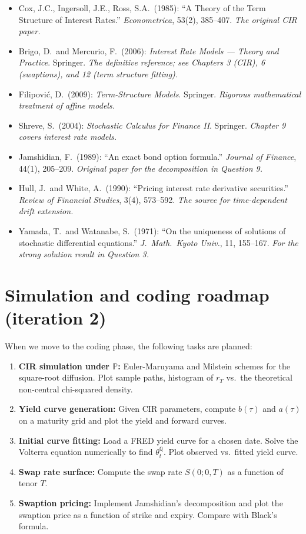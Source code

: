 \documentclass[11pt]{article}
\newcommand{\PP}{\mathbb{P}}
\newcommand{\QQ}{\mathbb{Q}}
\begin{document}
\begin{itemize}
  \item Cox, J.C., Ingersoll, J.E., Ross, S.A.\ (1985): ``A Theory of
  the Term Structure of Interest Rates.''  \emph{Econometrica}, 53(2),
  385--407.  \textit{The original CIR paper.}
  \item Brigo, D.\ and Mercurio, F.\ (2006): \emph{Interest Rate Models ---
  Theory and Practice}.  Springer.  \textit{The definitive reference;
  see Chapters 3 (CIR), 6 (swaptions), and 12 (term structure fitting).}
  \item Filipovi\'{c}, D.\ (2009): \emph{Term-Structure Models}.
  Springer.  \textit{Rigorous mathematical treatment of affine models.}
  \item Shreve, S.\ (2004): \emph{Stochastic Calculus for Finance II}.
  Springer.  \textit{Chapter 9 covers interest rate models.}
  \item Jamshidian, F.\ (1989): ``An exact bond option formula.''
  \emph{Journal of Finance}, 44(1), 205--209.  \textit{Original paper for
  the decomposition in Question 9.}
  \item Hull, J.\ and White, A.\ (1990): ``Pricing interest rate derivative
  securities.''  \emph{Review of Financial Studies}, 3(4), 573--592.
  \textit{The source for time-dependent drift extension.}
  \item Yamada, T.\ and Watanabe, S.\ (1971): ``On the uniqueness of
  solutions of stochastic differential equations.''
  \emph{J.\ Math.\ Kyoto Univ.}, 11, 155--167.
  \textit{For the strong solution result in Question 3.}
\end{itemize}

\section*{Simulation and coding roadmap (iteration 2)}

When we move to the coding phase, the following tasks are planned:

\begin{enumerate}
  \item \textbf{CIR simulation under $\PP$:} Euler-Maruyama and Milstein
  schemes for the square-root diffusion.  Plot sample paths, histogram of
  $r_T$ vs.\ the theoretical non-central chi-squared density.
  \item \textbf{Yield curve generation:} Given CIR parameters, compute
  $b(\tau)$ and $a(\tau)$ on a maturity grid and plot the yield and
  forward curves.
  \item \textbf{Initial curve fitting:} Load a FRED yield curve for a
  chosen date.  Solve the Volterra equation numerically to find
  $\theta_t^\QQ$. Plot observed vs.\ fitted yield curve.
  \item \textbf{Swap rate surface:} Compute the swap rate $S(0;0,T)$ as a
  function of tenor $T$.
  \item \textbf{Swaption pricing:} Implement Jamshidian's decomposition
  and plot the swaption price as a function of strike and expiry.
  Compare with Black's formula.
\end{enumerate}
\end{document}
